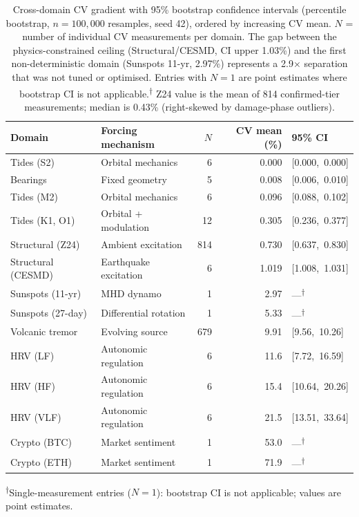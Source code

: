 \documentclass[11pt,a4paper]{article}
\begin{document}
\begin{table}[htbp]
\centering
\caption{Cross-domain CV gradient with 95\% bootstrap confidence intervals (percentile bootstrap, $n=100{,}000$ resamples, seed 42), ordered by increasing CV mean. $N$ = number of individual CV measurements per domain. The gap between the physics-constrained ceiling (Structural/CESMD, CI upper 1.03\%) and the first non-deterministic domain (Sunspots 11-yr, 2.97\%) represents a 2.9$\times$ separation that was not tuned or optimised. Entries with $N=1$ are point estimates where bootstrap CI is not applicable.\textsuperscript{$\dagger$} Z24 value is the mean of 814 confirmed-tier measurements; median is 0.43\% (right-skewed by damage-phase outliers).}
\label{tab:cvgradient}
\smallskip
\footnotesize
\begin{tabular}{llrrl}
\toprule
\textbf{Domain} & \textbf{Forcing mechanism} & \textbf{$N$} & \textbf{CV mean (\%)} & \textbf{95\% CI} \\
\midrule
Tides (S2)         & Orbital mechanics       &    6 & 0.000 & [0.000,\ 0.000] \\
Bearings           & Fixed geometry          &    5 & 0.008 & [0.006,\ 0.010] \\
Tides (M2)         & Orbital mechanics       &    6 & 0.096 & [0.088,\ 0.102] \\
Tides (K1, O1)     & Orbital + modulation    &   12 & 0.305 & [0.236,\ 0.377] \\
Structural (Z24)   & Ambient excitation      &  814 & 0.730 & [0.637,\ 0.830] \\
Structural (CESMD) & Earthquake excitation   &    6 & 1.019 & [1.008,\ 1.031] \\
\midrule
Sunspots (11-yr)   & MHD dynamo              &    1 & 2.97  & ---\textsuperscript{$\dagger$} \\
Sunspots (27-day)  & Differential rotation   &    1 & 5.33  & ---\textsuperscript{$\dagger$} \\
Volcanic tremor    & Evolving source         &  679 & 9.91  & [9.56,\ 10.26] \\
HRV (LF)           & Autonomic regulation    &    6 & 11.6  & [7.72,\ 16.59] \\
HRV (HF)           & Autonomic regulation    &    6 & 15.4  & [10.64,\ 20.26] \\
HRV (VLF)          & Autonomic regulation    &    6 & 21.5  & [13.51,\ 33.64] \\
Crypto (BTC)       & Market sentiment        &    1 & 53.0  & ---\textsuperscript{$\dagger$} \\
Crypto (ETH)       & Market sentiment        &    1 & 71.9  & ---\textsuperscript{$\dagger$} \\
\bottomrule
\end{tabular}
\par\smallskip\footnotesize\textsuperscript{$\dagger$}Single-measurement entries ($N=1$): bootstrap CI is not applicable; values are point estimates.
\end{table}
\end{document}
